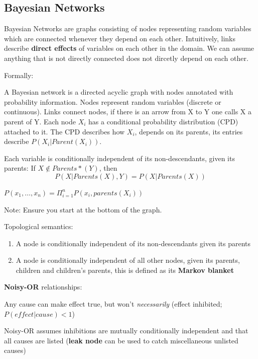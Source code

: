 \documentclass{article}
\begin{document}
\subsection{Bayesian Networks}

Bayesian Networks are graphs consisting of nodes representing random variables which are connected whenever they depend on each other. Intuitively, links describe \textbf{direct effects} of variables on each other in the domain. We can assume anything that is not directly connected does not dircetly depend on each other. \newline

Formally:

A Bayesian network is a directed acyclic graph with nodes annotated with probability information. Nodes represent random variables (discrete or continuous). Links connect nodes, if there is an arrow from X to Y one calls X a parent of Y. Each node $X_i$ has a conditional probability distribution (CPD) attached to it. The CPD describes how $X_i$, depends on its parents, its entries describe $P(X_i | Parent(X_i))$. \newline

Each variable is conditionally independent of its non-descendants, given its parents: If $X \notin Parents*(Y)$, then $$P(X| Parents(X),Y) = P(X | Parents(X))$$ \newline

$P(x_1, \ldots, x_n) = \Pi_{i=1}^n P(x_i, parents(X_i))$

Note: Ensure you start at the bottom of the graph. \newline

Topological semantics:
\begin{enumerate}
    \item A node is conditionally independent of its non-descendants given its parents
    \item A node is conditionally independent of all other nodes, given its parents, children and children's parents, this is defined as its \textbf{Markov blanket}
\end{enumerate}

\textbf{Noisy-OR} relationships: \newline

Any cause can make effect true, but won't \textit{necessarily} (effect inhibited; $P(effect | cause) < 1$)

Noisy-OR assumes inhibitions are mutually conditionally independent and that all causes are listed (\textbf{leak node} can be used to catch miscellaneous unlisted causes)
\end{document}
